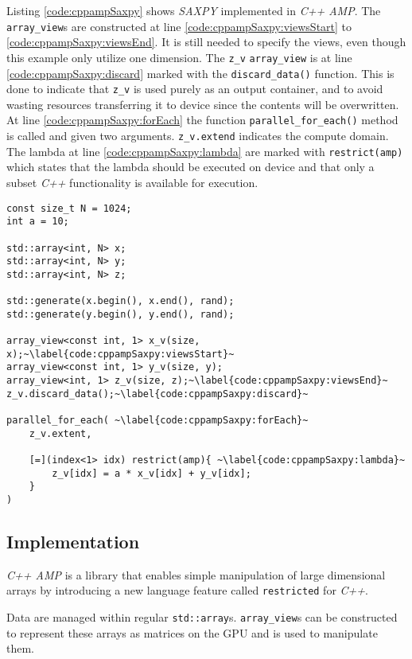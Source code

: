Listing \ref{code:cppampSaxpy} shows \textit{SAXPY} implemented in \textit{C++ AMP}. The \texttt{array\_view}s are constructed at line \ref{code:cppampSaxpy:viewsStart} to \ref{code:cppampSaxpy:viewsEnd}. It is still needed to specify the views, even though this example only utilize one dimension. The \texttt{z\_v} \texttt{array\_view} is at line \ref{code:cppampSaxpy:discard} marked with the \texttt{discard\_data()} function. This is done to indicate that \texttt{z\_v} is used purely as an output container, and to avoid wasting resources transferring it to device since the contents will be overwritten.
At line \ref{code:cppampSaxpy:forEach} the function \texttt{parallel\_for\_each()} method is called and given two arguments. \texttt{z\_v.extend} indicates the compute domain. The lambda at line \ref{code:cppampSaxpy:lambda} are marked with \texttt{restrict(amp)} which states that the lambda should be executed on device and that only a subset \textit{C++} functionality is available for execution.
\begin{lstlisting}[caption={\textit{C++ AMP} \textit{SAXPY} example.}, label={code:cppampSaxpy}]
const size_t N = 1024;
int a = 10;

std::array<int, N> x;
std::array<int, N> y;
std::array<int, N> z;

std::generate(x.begin(), x.end(), rand);
std::generate(y.begin(), y.end(), rand);

array_view<const int, 1> x_v(size, x);~\label{code:cppampSaxpy:viewsStart}~
array_view<const int, 1> y_v(size, y);
array_view<int, 1> z_v(size, z);~\label{code:cppampSaxpy:viewsEnd}~
z_v.discard_data();~\label{code:cppampSaxpy:discard}~

parallel_for_each( ~\label{code:cppampSaxpy:forEach}~
    z_v.extent,

    [=](index<1> idx) restrict(amp){ ~\label{code:cppampSaxpy:lambda}~
        z_v[idx] = a * x_v[idx] + y_v[idx];
    }
)
\end{lstlisting}

\subsection{Implementation}

\textit{C++ AMP} is a library that enables simple manipulation of large dimensional arrays by introducing a new language feature called \texttt{restricted} for \textit{C++}. 

Data are managed within regular \texttt{std::array}s. \texttt{array\_view}s can be constructed to represent these arrays as matrices on the GPU and is used to manipulate them.

